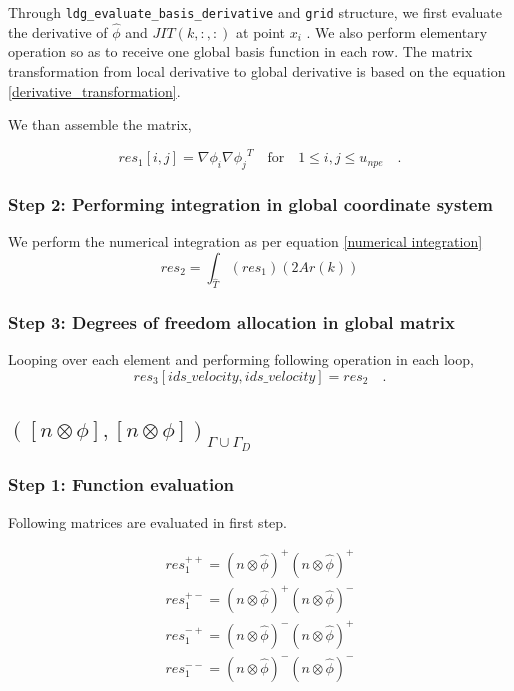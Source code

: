 \documentclass[a4paper,openany]{book}
\begin{document}
Through \verb|ldg_evaluate_basis_derivative| and \verb|grid| structure, we first evaluate the derivative of $\hat{\phi}$ and $JIT(k,:,:)$ at point $x_i$ . We also perform elementary operation so as to receive one global basis function in each row. The matrix transformation from local derivative to global derivative is based on the equation \eqref{derivative_transformation}.

We than assemble the matrix,
 
\begin{equation}
res_1[i,j]= {\nabla \phi_i} {\nabla \phi_j}^T \quad \textrm{for} \quad 1 \leq i,j \leq u_{npe} \quad \textrm{.}
\end{equation}

\subsubsection{Step 2: Performing integration in global coordinate system}

We perform the numerical integration as per equation \eqref{numerical integration} 
\begin{equation}
res_2 = \int_{\hat{T}} (res_1) (2 Ar(k))
\end{equation}

\subsubsection{Step 3: Degrees of freedom allocation in global matrix}
 
Looping over each element and performing following operation in each loop,
\begin{equation}
res_3[ids\_velocity,ids\_velocity]=res_2 \quad \textrm{.}
\end{equation}


\subsection{$([n \otimes \phi], [n \otimes \phi])_{\Gamma \cup \Gamma_D}$}

\subsubsection{Step 1: Function evaluation} 

Following matrices are evaluated in first step.

\begin{equation}
\begin{split}
res_1^{++} = (n \otimes \hat{\phi})^+ (n \otimes \hat{\phi})^+\\
res_1^{+-} = (n \otimes \hat{\phi})^+ (n \otimes \hat{\phi})^-\\
res_1^{-+} = (n \otimes \hat{\phi})^- (n \otimes \hat{\phi})^+\\
res_1^{--} = (n \otimes \hat{\phi})^- (n \otimes \hat{\phi})^-\\
\end{split}
\end{equation}
\end{document}
